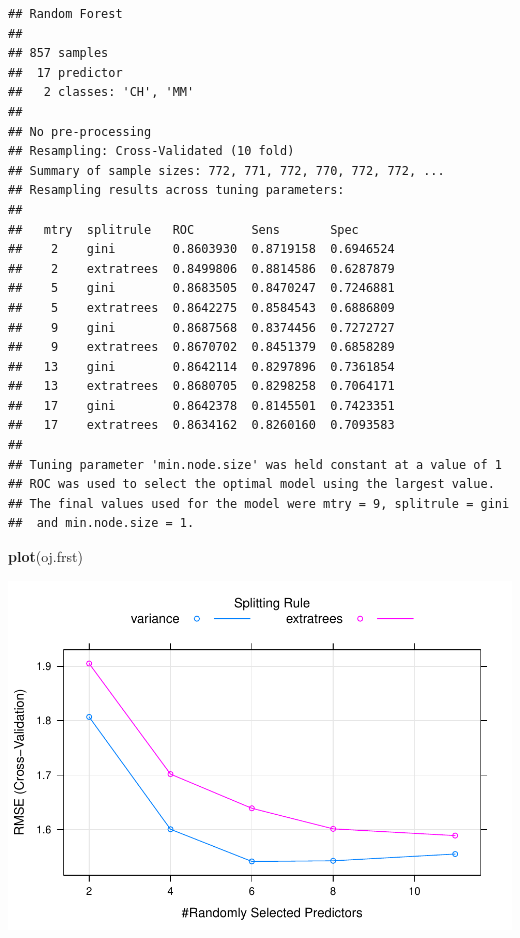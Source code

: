 \documentclass[
]{book}
\newenvironment{Shaded}{\begin{snugshade}}{\end{snugshade}}
\newcommand{\DataTypeTok}[1]{\textcolor[rgb]{0.13,0.29,0.53}{#1}}
\newcommand{\KeywordTok}[1]{\textcolor[rgb]{0.13,0.29,0.53}{\textbf{#1}}}
\newcommand{\NormalTok}[1]{#1}
\newcommand{\OperatorTok}[1]{\textcolor[rgb]{0.81,0.36,0.00}{\textbf{#1}}}
\newcommand{\StringTok}[1]{\textcolor[rgb]{0.31,0.60,0.02}{#1}}
\begin{document}
\begin{verbatim}
## Random Forest 
## 
## 857 samples
##  17 predictor
##   2 classes: 'CH', 'MM' 
## 
## No pre-processing
## Resampling: Cross-Validated (10 fold) 
## Summary of sample sizes: 772, 771, 772, 770, 772, 772, ... 
## Resampling results across tuning parameters:
## 
##   mtry  splitrule   ROC        Sens       Spec     
##    2    gini        0.8603930  0.8719158  0.6946524
##    2    extratrees  0.8499806  0.8814586  0.6287879
##    5    gini        0.8683505  0.8470247  0.7246881
##    5    extratrees  0.8642275  0.8584543  0.6886809
##    9    gini        0.8687568  0.8374456  0.7272727
##    9    extratrees  0.8670702  0.8451379  0.6858289
##   13    gini        0.8642114  0.8297896  0.7361854
##   13    extratrees  0.8680705  0.8298258  0.7064171
##   17    gini        0.8642378  0.8145501  0.7423351
##   17    extratrees  0.8634162  0.8260160  0.7093583
## 
## Tuning parameter 'min.node.size' was held constant at a value of 1
## ROC was used to select the optimal model using the largest value.
## The final values used for the model were mtry = 9, splitrule = gini
##  and min.node.size = 1.
\end{verbatim}

\begin{Shaded}
\begin{Highlighting}[]
\KeywordTok{plot}\NormalTok{(oj.frst)}
\end{Highlighting}
\end{Shaded}

\includegraphics{data-sci_files/figure-latex/unnamed-chunk-84-1.pdf}

\begin{Shaded}
\end{Shaded}
\end{document}
